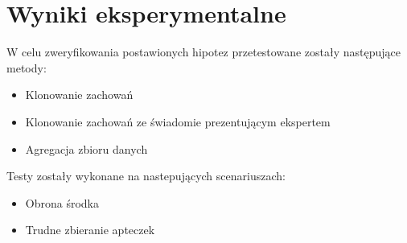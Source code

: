 \chapter{Wyniki eksperymentalne}

W celu zweryfikowania postawionych hipotez przetestowane zostały następujące metody:

\begin{itemize}
\item{Klonowanie zachowań}
\item{Klonowanie zachowań ze świadomie prezentującym ekspertem}
\item{Agregacja zbioru danych}
\end{itemize}

Testy zostały wykonane na nastepujących scenariuszach:

\begin{itemize}
\item{Obrona środka}
\item{Trudne zbieranie apteczek}
\end{itemize}









